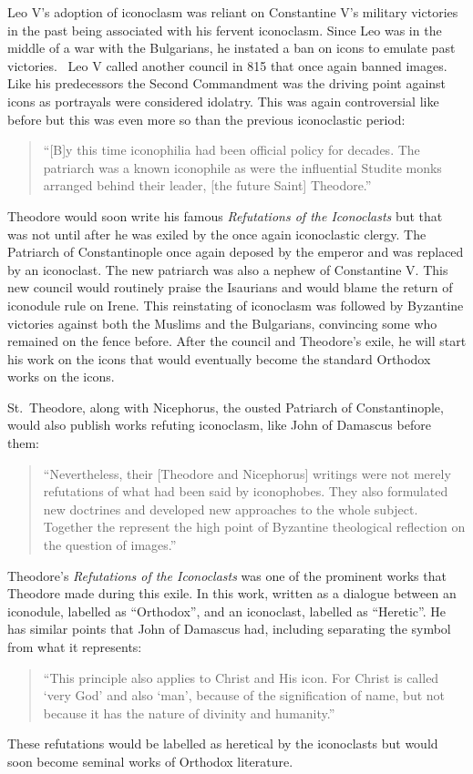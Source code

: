 \documentclass[12pt]{article}
\begin{document}
    Leo V's adoption of iconoclasm was reliant on Constantine V's military victories in the past being associated with his fervent iconoclasm. Since Leo was in the middle of a war with the Bulgarians, he instated a ban on icons to emulate past victories.~\cite[p. 130]{IconIdolatry} Leo V called another council in 815 that once again banned images. Like his predecessors the Second Commandment was the driving point against icons as portrayals were considered idolatry. This was again controversial like before but this was even more so than the previous iconoclastic period: \begin{quote}
        ``[B]y this time iconophilia had been official policy for decades. The patriarch was a known iconophile as were the influential Studite monks arranged behind their leader, [the future Saint] Theodore.''~\cite[p. 247]{Noble6}
    \end{quote}\noindent
    Theodore would soon write his famous \emph{Refutations of the Iconoclasts} but that was not until after he was exiled by the once again iconoclastic clergy. The Patriarch of Constantinople once again deposed by the emperor and was replaced by an iconoclast. The new patriarch was also a nephew of Constantine V. This new council would routinely praise the Isaurians and would blame the return of iconodule rule on Irene. This reinstating of iconoclasm was followed by Byzantine victories against both the Muslims and the Bulgarians, convincing some who remained on the fence before. After the council and Theodore's exile, he will start his work on the icons that would eventually become the standard Orthodox works on the icons. \

    St.\ Theodore, along with Nicephorus, the ousted Patriarch of Constantinople, would also publish works refuting iconoclasm, like John of Damascus before them: \begin{quote}
        ``Nevertheless, their [Theodore and Nicephorus] writings were not merely refutations of what had been said by iconophobes. They also formulated new doctrines and developed new approaches to the whole subject. Together the represent the high point of Byzantine theological reflection on the question of images.''~\cite[p. 252]{Noble6}
    \end{quote}\noindent
    Theodore's \emph{Refutations of the Iconoclasts} was one of the prominent works that Theodore made during this exile. In this work, written as a dialogue between an iconodule, labelled as ``Orthodox'', and an iconoclast, labelled as ``Heretic''. He has similar points that John of Damascus had, including separating the symbol from what it represents: \begin{quote}
        ``This principle also applies to Christ and His icon. For Christ is called `very God' and also `man', because of the signification of name, but not because it has the nature of divinity and humanity.''~\cite[p. 52]{OntheIcons}
    \end{quote}\noindent
    These refutations would be labelled as heretical by the iconoclasts but would soon become seminal works of Orthodox literature. \
\end{document}
